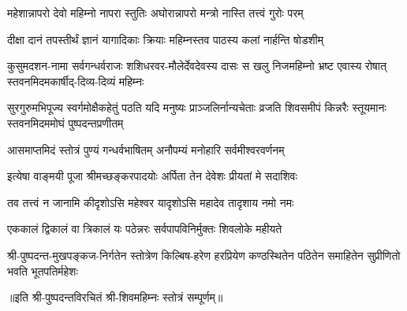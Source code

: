 \twolineshloka
{महेशान्नापरो देवो महिम्नो नापरा स्तुतिः}
{अघोरान्नापरो मन्त्रो नास्ति तत्त्वं गुरोः परम्}%

\twolineshloka
{दीक्षा दानं तपस्तीर्थं ज्ञानं यागादिकाः क्रियाः}
{महिम्नस्तव पाठस्य कलां नार्हन्ति षोडशीम्}%

\fourlineindentedshloka
{कुसुमदशन-नामा सर्वगन्धर्वराजः}
{शशिधरवर-मौलेर्देवदेवस्य दासः}
{स खलु निजमहिम्नो भ्रष्ट एवास्य रोषात्}
{स्तवनमिदमकार्षीद्-दिव्य-दिव्यं महिम्नः}%

\fourlineindentedshloka
{सुरगुरुमभिपूज्य स्वर्गमोक्षैकहेतुं}
{पठति यदि मनुष्यः प्राञ्जलिर्नान्यचेताः}
{व्रजति शिवसमीपं किन्नरैः स्तूयमानः}
{स्तवनमिदममोघं पुष्पदन्तप्रणीतम्}%

\twolineshloka
{आसमाप्तमिदं स्तोत्रं पुण्यं गन्धर्वभाषितम्}
{अनौपम्यं मनोहारि सर्वमीश्वरवर्णनम्}%

\twolineshloka
{इत्येषा वाङ्मयी पूजा श्रीमच्छङ्करपादयोः}
{अर्पिता तेन देवेशः प्रीयतां मे सदाशिवः}%

\twolineshloka
{तव तत्त्वं न जानामि कीदृशोऽसि महेश्वर}
{यादृशोऽसि महादेव तादृशाय नमो नमः}%

\twolineshloka
{एककालं द्विकालं वा त्रिकालं यः पठेन्नरः}
{सर्वपापविनिर्मुक्तः शिवलोके महीयते}%

\fourlineindentedshloka
{श्री-पुष्पदन्त-मुखपङ्कज-निर्गतेन}
{स्तोत्रेण किल्बिष-हरेण हरप्रियेण}
{कण्ठस्थितेन पठितेन समाहितेन}
{सुप्रीणितो भवति भूतपतिर्महेशः}%

॥इति श्री-पुष्पदन्तविरचितं श्री-शिवमहिम्नः स्तोत्रं सम्पूर्णम्॥